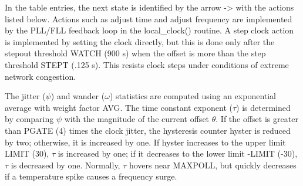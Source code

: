 In the table entries, the next state is identified by the arrow ->
with the actions listed below.  Actions such as adjust time and
adjust frequency are implemented by the PLL/FLL feedback loop in the
local\_clock() routine.  A step clock action is implemented by setting
the clock directly, but this is done only after the stepout threshold
WATCH (900 s) when the offset is more than the step threshold STEPT
(.125 s).  This resists clock steps under conditions of extreme
network congestion.

The jitter ($ \psi $) and wander ($ \omega $) statistics are computed using an
exponential average with weight factor AVG.  The time constant
exponent ($ \tau $) is determined by comparing $ \psi $ with the magnitude of
the current offset $ \theta $.  If the offset is greater than PGATE (4)
times the clock jitter, the hysteresis counter hyster is reduced by
two; otherwise, it is increased by one.  If hyster increases to the
upper limit LIMIT (30), $ \tau $ is increased by one; if it decreases to
the lower limit -LIMIT (-30), $ \tau $ is decreased by one.  Normally, $ \tau $
hovers near MAXPOLL, but quickly decreases if a temperature spike
causes a frequency surge.
